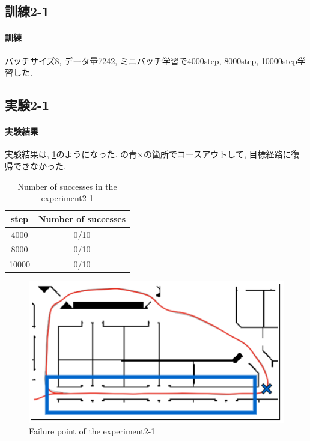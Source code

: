 \subsection{訓練2-1} 

\paragraph{訓練}
バッチサイズ8, データ量7242, ミニバッチ学習で4000step, 8000step, 10000step学習した.

\subsection{実験2-1}

\paragraph{実験結果}
実験結果は, \ref{tb:exp2}のようになった. の青×の箇所でコースアウトして, 目標経路に復帰できなかった. 

\begin{table}[h]
  \centering
  \begin{tabular}{|c|c|} \hline
    step & Number of successes \\ \hline
    4000 & 0/10 \\ \hline
    8000 & 0/10 \\ \hline
    10000 & 0/10 \\ \hline
  \end{tabular}
  \caption{Number of successes in the experiment2-1}
  \label{tb:exp2}
\end{table}

\begin{figure}[h]
  \centering
  \includegraphics[keepaspectratio, scale=0.6]{images/result2.png}
  \caption{Failure point of the experiment2-1}
  \label{Fig:result2}
  \end{figure}

